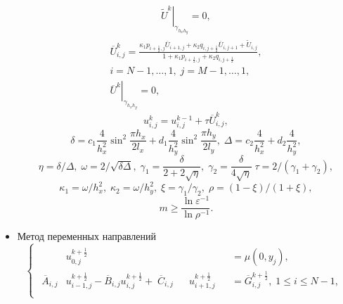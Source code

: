 \begin{itemize}
\begin{equation}
\begin{gathered}
    \left. \tilde{U}^k \right|_{\gamma_{h_x h_y}} = 0,
  \end{gathered}
  \end{equation}
  \begin{equation}
  \begin{gathered}
    \overline{U}_{i, j}^k = \frac{\kappa_1 p_{i+\frac{1}{2}, j} \overline{U}_{i+1, j} + \kappa_2 q_{i, j+\frac{1}{2}} \overline{U}_{i, j+1} + \tilde{U}_{i, j}}{1 + \kappa_1 p_{i+\frac{1}{2}, j} + \kappa_2 q_{i, j+\frac{1}{2}}}, \\
    i = N - 1, \ldots, 1, \; j = M - 1, \ldots, 1, \\
    \left. \overline{U}^k \right|_{\gamma_{h_x h_y}} = 0,
  \end{gathered}
  \end{equation}
  \begin{equation}
    u_{i, j}^k = u_{i, j}^{k-1} + \tau \overline{U}_{i, j}^k,
  \end{equation}
  \begin{equation}
    \delta = c_1 \frac{4}{h_x^2} \sin^2{\frac{\pi h_x}{2 l_x}} + d_1 \frac{4}{h_y^2} \sin^2{\frac{\pi h_y}{2 l_y}}, \; \Delta = c_2 \frac{4}{h_x^2} + d_2 \frac{4}{h_y^2},
  \end{equation}
  \begin{equation}
    \eta = \delta / \Delta, \; \omega = 2 / \sqrt{\delta \Delta}, \; \gamma_1 = \frac{\delta}{2 + 2 \sqrt{\eta}}, \; \gamma_2 = \frac{\delta}{4 \sqrt{\eta}} \; \tau = 2 / (\gamma_1 + \gamma_2),
  \end{equation}
  \begin{equation}
    \kappa_1 = \omega / h_x^2, \; \kappa_2 = \omega / h_y^2, \; \xi = \gamma_1 / \gamma_2, \; \rho = (1 - \xi) / (1 + \xi),
  \end{equation}
  \begin{equation}
    m \geqslant \frac{\ln\varepsilon^{-1}}{\ln{\rho^{-1}}}.
  \end{equation}
  \item Метод переменных направлений
  \begin{equation}
  \begin{cases}
  \begin{alignedat}{3}
    & u_{0, j}^{k+\frac{1}{2}} && && = \mu(0, y_j), \\
    \overline{A}_{i, j} & u_{i-1, j}^{k+\frac{1}{2}} - \overline{B}_{i, j} u_{i, j}^{k+\frac{1}{2}} + \; \overline{C}_{i, j} && u_{i+1, j}^{k+\frac{1}{2}} && = \overline{G}_{i, j}^{k+\frac{1}{2}}, \; 1 \leqslant i \leqslant N - 1, \\

\end{alignedat}
\end{cases}
\end{equation}
\end{itemize}
